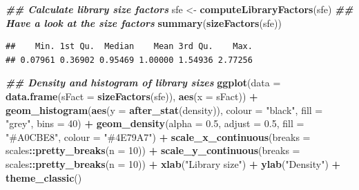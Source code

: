\documentclass[
]{book}
\newenvironment{Shaded}{\begin{snugshade}}{\end{snugshade}}
\newcommand{\AttributeTok}[1]{\textcolor[rgb]{0.13,0.29,0.53}{#1}}
\newcommand{\DecValTok}[1]{\textcolor[rgb]{0.00,0.00,0.81}{#1}}
\newcommand{\DocumentationTok}[1]{\textcolor[rgb]{0.56,0.35,0.01}{\textbf{\textit{#1}}}}
\newcommand{\FloatTok}[1]{\textcolor[rgb]{0.00,0.00,0.81}{#1}}
\newcommand{\FunctionTok}[1]{\textcolor[rgb]{0.13,0.29,0.53}{\textbf{#1}}}
\newcommand{\NormalTok}[1]{#1}
\newcommand{\OtherTok}[1]{\textcolor[rgb]{0.56,0.35,0.01}{#1}}
\newcommand{\SpecialCharTok}[1]{\textcolor[rgb]{0.81,0.36,0.00}{\textbf{#1}}}
\newcommand{\StringTok}[1]{\textcolor[rgb]{0.31,0.60,0.02}{#1}}
\begin{document}
\begin{Shaded}
\begin{Highlighting}[]
\DocumentationTok{\#\# Calculate library size factors}
\NormalTok{sfe }\OtherTok{\textless{}{-}} \FunctionTok{computeLibraryFactors}\NormalTok{(sfe)}
\DocumentationTok{\#\# Have a look at the size factors}
\FunctionTok{summary}\NormalTok{(}\FunctionTok{sizeFactors}\NormalTok{(sfe))}
\end{Highlighting}
\end{Shaded}

\begin{verbatim}
##    Min. 1st Qu.  Median    Mean 3rd Qu.    Max. 
## 0.07961 0.36902 0.95469 1.00000 1.54936 2.77256
\end{verbatim}

\begin{Shaded}
\begin{Highlighting}[]
\DocumentationTok{\#\# Density and histogram of library sizes}
\FunctionTok{ggplot}\NormalTok{(}\AttributeTok{data =} \FunctionTok{data.frame}\NormalTok{(}\AttributeTok{sFact =} \FunctionTok{sizeFactors}\NormalTok{(sfe)), }
       \FunctionTok{aes}\NormalTok{(}\AttributeTok{x =}\NormalTok{ sFact)) }\SpecialCharTok{+}
    \FunctionTok{geom\_histogram}\NormalTok{(}\FunctionTok{aes}\NormalTok{(}\AttributeTok{y =} \FunctionTok{after\_stat}\NormalTok{(density)), }
                   \AttributeTok{colour =} \StringTok{"black"}\NormalTok{, }
                   \AttributeTok{fill =} \StringTok{"grey"}\NormalTok{,}
                   \AttributeTok{bins =} \DecValTok{40}\NormalTok{) }\SpecialCharTok{+}
    \FunctionTok{geom\_density}\NormalTok{(}\AttributeTok{alpha =} \FloatTok{0.5}\NormalTok{,}
                 \AttributeTok{adjust =} \FloatTok{0.5}\NormalTok{,}
                 \AttributeTok{fill =} \StringTok{"\#A0CBE8"}\NormalTok{,}
                 \AttributeTok{colour =} \StringTok{"\#4E79A7"}\NormalTok{) }\SpecialCharTok{+}
    \FunctionTok{scale\_x\_continuous}\NormalTok{(}\AttributeTok{breaks =}\NormalTok{ scales}\SpecialCharTok{::}\FunctionTok{pretty\_breaks}\NormalTok{(}\AttributeTok{n =} \DecValTok{10}\NormalTok{)) }\SpecialCharTok{+} 
    \FunctionTok{scale\_y\_continuous}\NormalTok{(}\AttributeTok{breaks =}\NormalTok{ scales}\SpecialCharTok{::}\FunctionTok{pretty\_breaks}\NormalTok{(}\AttributeTok{n =} \DecValTok{10}\NormalTok{)) }\SpecialCharTok{+} 
    \FunctionTok{xlab}\NormalTok{(}\StringTok{"Library size"}\NormalTok{) }\SpecialCharTok{+} 
    \FunctionTok{ylab}\NormalTok{(}\StringTok{"Density"}\NormalTok{) }\SpecialCharTok{+} 
    \FunctionTok{theme\_classic}\NormalTok{()}
\end{Highlighting}
\end{Shaded}
\end{document}
